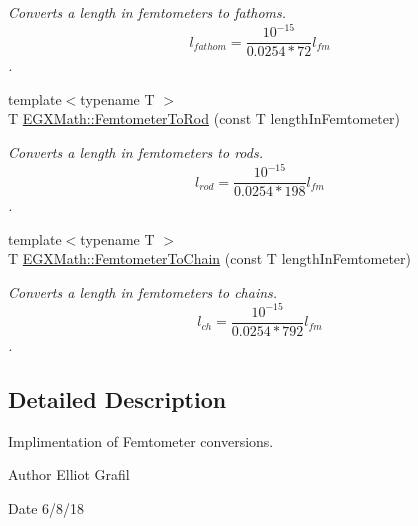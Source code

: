 \begin{DoxyCompactItemize}
\begin{DoxyCompactList}\small\item\em Converts a length in femtometers to fathoms. \[ l_{fathom}= \frac{10^{-15}}{0.0254 * 72} l_{fm} \]. \end{DoxyCompactList}\item 
{\footnotesize template$<$typename T $>$ }\\T \mbox{\hyperlink{group___e_g_x_math-_conversions-_length_conversions-_s_i-_femtometer-_surveyors_ga29f133c21de5eca2aa12f88caf6da86f}{E\+G\+X\+Math\+::\+Femtometer\+To\+Rod}} (const T length\+In\+Femtometer)
\begin{DoxyCompactList}\small\item\em Converts a length in femtometers to rods. \[ l_{rod}= \frac{10^{-15}}{0.0254 * 198} l_{fm} \]. \end{DoxyCompactList}\item 
{\footnotesize template$<$typename T $>$ }\\T \mbox{\hyperlink{group___e_g_x_math-_conversions-_length_conversions-_s_i-_femtometer-_surveyors_gac3220ddaefa889db44eb85690203f345}{E\+G\+X\+Math\+::\+Femtometer\+To\+Chain}} (const T length\+In\+Femtometer)
\begin{DoxyCompactList}\small\item\em Converts a length in femtometers to chains. \[ l_{ch}= \frac{10^{-15}}{0.0254 * 792} l_{fm} \]. \end{DoxyCompactList}\end{DoxyCompactItemize}


\subsection{Detailed Description}
Implimentation of Femtometer conversions. 

\begin{DoxyAuthor}{Author}
Elliot Grafil 
\end{DoxyAuthor}
\begin{DoxyDate}{Date}
6/8/18 
\end{DoxyDate}
